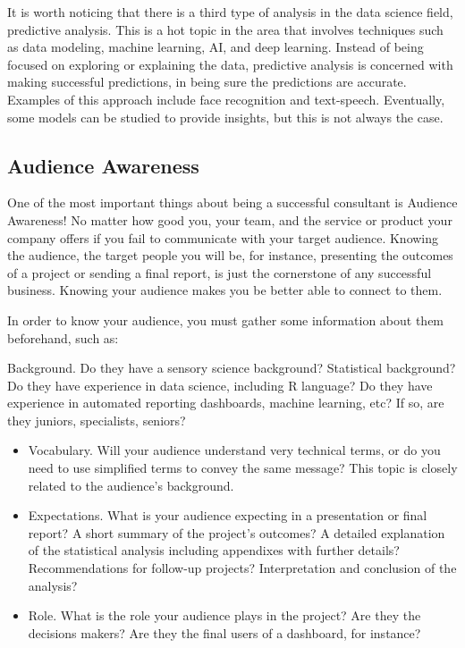 \documentclass[
]{book}
\begin{document}
It is worth noticing that there is a third type of analysis in the data science field, predictive analysis. This is a hot topic in the area that involves techniques such as data modeling, machine learning, AI, and deep learning. Instead of being focused on exploring or explaining the data, predictive analysis is concerned with making successful predictions, in being sure the predictions are accurate. Examples of this approach include face recognition and text-speech. Eventually, some models can be studied to provide insights, but this is not always the case.

\hypertarget{audience-awareness}{%
\subsection{Audience Awareness}\label{audience-awareness}}

One of the most important things about being a successful consultant is Audience Awareness! No matter how good you, your team, and the service or product your company offers if you fail to communicate with your target audience. Knowing the audience, the target people you will be, for instance, presenting the outcomes of a project or sending a final report, is just the cornerstone of any successful business. Knowing your audience makes you be better able to connect to them.

In order to know your audience, you must gather some information about them beforehand, such as:

Background. Do they have a sensory science background? Statistical background? Do they have experience in data science, including R language? Do they have experience in automated reporting dashboards, machine learning, etc? If so, are they juniors, specialists, seniors?

\begin{itemize}
\item
  Vocabulary. Will your audience understand very technical terms, or do you need to use simplified terms to convey the same message? This topic is closely related to the audience's background.
\item
  Expectations. What is your audience expecting in a presentation or final report? A short summary of the project's outcomes? A detailed explanation of the statistical analysis including appendixes with further details? Recommendations for follow-up projects? Interpretation and conclusion of the analysis?
\item
  Role. What is the role your audience plays in the project? Are they the decisions makers? Are they the final users of a dashboard, for instance?
\end{itemize}
\end{document}
